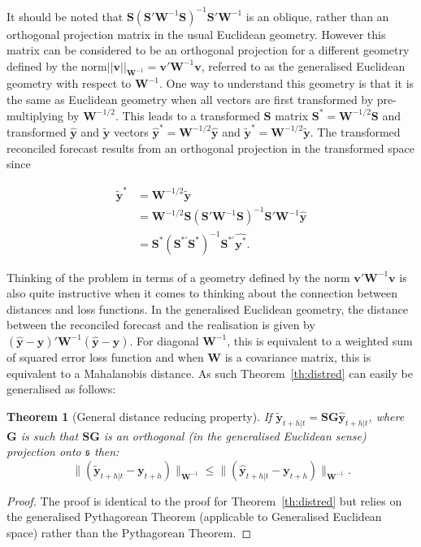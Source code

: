 \documentclass[12pt]{article}
\newtheorem{theo}{Theorem}[section]
\theoremstyle{definition}
\theoremstyle{property}
\begin{document}
	It should be noted that  $\bm{S}\left(\bm{S}'\bm{W}^{-1}\bm{S}\right)^{-1}\bm{S}'\bm{W}^{-1}$ is an oblique, rather than an orthogonal projection matrix in the usual Euclidean geometry.  However this matrix can be considered to be an orthogonal projection for a different geometry defined by the norm\break $||\bm{v}||_{{\bm W}^{-1}}=\bm{v}'\bm{W}^{-1}\bm{v}$, referred to as the generalised Euclidean geometry with respect to $\bm{W}^{-1}$.  One way to understand this geometry is that it is the same as Euclidean geometry when all vectors are first transformed by pre-multiplying by $\bm{W}^{-1/2}$.  This leads to a transformed $\bm{S}$ matrix $\bm{S}^*=\bm{W}^{-1/2}\bm{S}$ and transformed $\hat{\bm{y}}$ and $\tilde{\bm{y}}$ vectors $\hat{\bm{y}}^*=\bm{W}^{-1/2}\hat{\bm{y}}$ and $\tilde{\bm{y}}^*=\bm{W}^{-1/2}\tilde{\bm{y}}$.  The transformed reconciled forecast results from an orthogonal projection in the transformed space since
	
	\begin{align}
	\tilde{\bm{y}}^*&=\bm{W}^{-1/2}\tilde{\bm{y}}\\&=\bm{W}^{-1/2}\bm{S}\left(\bm{S}'\bm{W}^{-1}\bm{S}\right)^{-1}\bm{S}'\bm{W}^{-1}\hat{\bm{y}}
	\\&=\bm{S}^*\left(\bm{S}^{*'}\bm{S}^*\right)^{-1}\bm{S}^{*'}\hat{\bm{y}^*}.
	\end{align}
	
Thinking of the problem in terms of a geometry defined by the norm $\bm{v}'\bm{W}^{-1}\bm{v}$ is also quite instructive when it comes to thinking about the connection between distances and loss functions. In the generalised Euclidean geometry, the distance between the reconciled forecast and the realisation is given by $(\hat{\bm{y}}-\bm{y})'\bm{W}^{-1}(\hat{\bm{y}}-\bm{y})$.  For diagonal $\bm{W}^{-1}$, this is equivalent to a weighted sum of squared error loss function and when $\bm{W}$ is a covariance matrix, this is equivalent to a Mahalanobis distance.  As such Theorem~\ref{th:distred} can easily be generalised as follows:
	
	\begin{theo}[General distance reducing property]\label{th:gdistred}
        If $\tilde{\bm{y}}_{t+h|t}=\bm{S}\bm{G}\hat{\bm{y}}_{t+h|t}$, where $\bm{G}$ is such that $\bm{S}\bm{G}$ is an orthogonal (in the generalised Euclidean sense) projection onto $\mathfrak{s}$ then:
		\begin{equation}
		\|(\tilde{\bm{y}}_{t+h|t}-\bm{y}_{t+h})\|_{{\bm W}^{-1}}\le\|(\hat{\bm{y}}_{t+h|t}-\bm{y}_{t+h})\|_{{\bm W}^{-1}}.
		\end{equation}
	\end{theo}
	\begin{proof}
    The proof is identical to the proof for Theorem~\ref{th:distred} but relies on the generalised Pythagorean Theorem (applicable to Generalised Euclidean space) rather than the Pythagorean Theorem.
    \end{proof}
	
\end{document}
